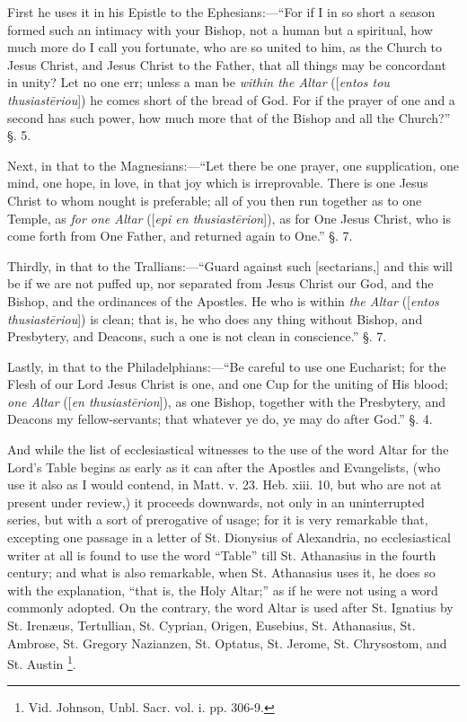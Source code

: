First he uses it in his Epistle to the Ephesians:—``For if I in so short a season formed such an intimacy with your
Bishop, not a human but a spiritual, how much more do I call you
fortunate, who are so united to him, as the Church to Jesus Christ,
and Jesus Christ to the Father, that all things may be concordant in
unity? Let no one err; unless a man be \emph{within the Altar} ([\emph{entos
tou thusiast\={e}riou}]) he comes short of the bread of God. For
if the prayer of one and a second has such power, how much more that
of the Bishop and all the Church?'' §. 5.

Next, in that to the Magnesians:—``Let there
be one prayer, one supplication, one mind, one hope, in love, in that
joy which is irreprovable. There is one Jesus Christ to whom nought is
preferable; all of you then run together as to one Temple, as \emph{for
one Altar} ([\emph{epi en thusiast\={e}rion}]), as for One Jesus
Christ, who is come forth from One Father, and returned again to
One.'' §. 7.

Thirdly, in that to the Trallians:—``Guard
against such [sectarians,] and this will be if we are not puffed up,
nor separated from Jesus Christ our God, and the Bishop, and the
ordinances of the Apostles. He who is within \emph{the Altar} ([\emph{entos
thusiast\={e}riou}]) is clean; that is, he who does any thing
without Bishop, and Presbytery, and Deacons, such a one is not clean
in conscience.'' §. 7.

Lastly, in that to the Philadelphians:—``Be
careful to use one Eucharist; for the Flesh of our Lord Jesus Christ
is one, and one Cup for the uniting of His blood; \emph{one Altar} ([\emph{en
thusiast\={e}rion}]), as one Bishop, together with the
Presbytery, and Deacons my fellow-servants; that whatever ye do, ye
may do after God.'' §. 4.

And while the list of ecclesiastical witnesses to
the use of the word Altar for the Lord's Table begins as early as it
can after the Apostles and Evangelists, (who use it also as I would
contend, in Matt. v. 23. Heb. xiii. 10, but who are not at present
under review,) it proceeds downwards, not only in an uninterrupted
series, but with a sort of prerogative of usage; for it is very
remarkable that, excepting one passage in a letter of St. Dionysius of
Alexandria, no ecclesiastical writer at all is found to use the
word ``Table'' till St. Athanasius in the fourth century; and what
is also remarkable, when St. Athanasius uses it, he does so with the
explanation, ``that is, the Holy Altar;'' as if he were not using a
word commonly adopted. On the contrary, the word Altar is used after
St. Ignatius by St. Irenæus, Tertullian, St. Cyprian, Origen,
Eusebius, St. Athanasius, St. Ambrose, St. Gregory Nazianzen, St.
Optatus, St. Jerome, St. Chrysostom, and St. Austin \footnote{Vid. Johnson, Unbl. Sacr. vol. i. pp. 306-9.}.


